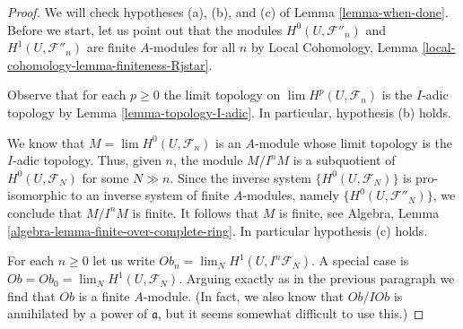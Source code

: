 \documentclass[10pt,a4paper]{amsart}
\theoremstyle{plain}
\theoremstyle{definition}
\theoremstyle{remark}
\numberwithin{equation}{subsection}
\def\lim{\mathop{\mathrm{lim}}\nolimits}
\begin{document}
\begin{proof}
We will check hypotheses (a), (b), and (c) of Lemma \ref{lemma-when-done}.
Before we start, let us point out that the modules
$H^0(U, \mathcal{F}''_n)$ and $H^1(U, \mathcal{F}''_n)$
are finite $A$-modules for all $n$ by
Local Cohomology, Lemma \ref{local-cohomology-lemma-finiteness-Rjstar}.

\medskip\noindent
Observe that for each $p \geq 0$
the limit topology on $\lim H^p(U, \mathcal{F}_n)$
is the $I$-adic topology by Lemma \ref{lemma-topology-I-adic}.
In particular, hypothesis (b) holds.

\medskip\noindent
We know that $M = \lim H^0(U, \mathcal{F}_n)$ is an $A$-module whose
limit topology is the $I$-adic topology. Thus, given $n$, the module
$M/I^nM$ is a subquotient of $H^0(U, \mathcal{F}_N)$ for some $N \gg n$.
Since the inverse system $\{H^0(U, \mathcal{F}_N)\}$ is pro-isomorphic to an
inverse system of finite $A$-modules, namely $\{H^0(U, \mathcal{F}''_N)\}$,
we conclude that $M/I^nM$ is finite. It follows that $M$ is finite, see
Algebra, Lemma \ref{algebra-lemma-finite-over-complete-ring}.
In particular hypothesis (c) holds.

\medskip\noindent
For each $n \geq 0$ let us write $Ob_n = \lim_N H^1(U, I^n\mathcal{F}_N)$.
A special case is $Ob = Ob_0 = \lim_N H^1(U, \mathcal{F}_N)$.
Arguing exactly as in the previous paragraph we find that $Ob$
is a finite $A$-module. (In fact, we also know that $Ob/I Ob$ is annihilated
by a power of $\mathfrak a$, but it seems somewhat difficult to use this.)


\end{proof}
\end{document}
